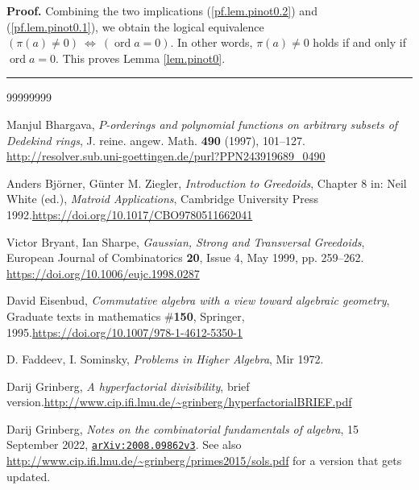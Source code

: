 \documentclass[numbers=enddot,12pt,final,onecolumn,notitlepage]{scrartcl}%
\theoremstyle{definition}
\newenvironment{proof}[1][Proof]{\noindent\textbf{#1.} }{\ \rule{0.5em}{0.5em}}
\theoremstyle{plainsl}
\begin{document}
\begin{proof}
Combining the two implications (\ref{pf.lem.pinot0.2}) and
(\ref{pf.lem.pinot0.1}), we obtain the logical equivalence $\left(  \pi\left(
a\right)  \neq0\right)  \ \Longleftrightarrow\ \left(  \operatorname*{ord}%
a=0\right)  $. In other words, $\pi\left(  a\right)  \neq0$ holds if and only
if $\operatorname*{ord}a=0$. This proves Lemma \ref{lem.pinot0}.
\end{proof}

\begin{thebibliography}{99999999}                                                                                         %


Manjul Bhargava, \textit{$P$-orderings and
polynomial functions on arbitrary subsets of Dedekind rings}, J. reine. angew.
Math. \textbf{490} (1997), 101--127. \url{http://resolver.sub.uni-goettingen.de/purl?PPN243919689_0490}

Anders Bj\"{o}rner, G\"{u}nter M. Ziegler,
\textit{Introduction to Greedoids}, Chapter 8 in: Neil White (ed.),
\textit{Matroid Applications}, Cambridge University Press 1992.\newline\url{https://doi.org/10.1017/CBO9780511662041}

Victor Bryant, Ian Sharpe, \textit{Gaussian,
Strong and Transversal Greedoids}, European Journal of Combinatorics
\textbf{20}, Issue 4, May 1999, pp. 259--262. \url{https://doi.org/10.1006/eujc.1998.0287}

David Eisenbud, \textit{Commutative algebra with a
view toward algebraic geometry}, Graduate texts in mathematics \#\textbf{150},
Springer, 1995.\newline\url{https://doi.org/10.1007/978-1-4612-5350-1}

D. Faddeev, I. Sominsky, \textit{Problems in
Higher Algebra}, Mir 1972.

Darij Grinberg, \textit{A hyperfactorial
divisibility}, brief version.\newline\url{http://www.cip.ifi.lmu.de/~grinberg/hyperfactorialBRIEF.pdf}

Darij Grinberg, \textit{Notes on the combinatorial
fundamentals of algebra}, 15 September 2022,
\texttt{\href{https://arxiv.org/abs/2008.09862v3}{arXiv:2008.09862v3}}. See
also \url{http://www.cip.ifi.lmu.de/~grinberg/primes2015/sols.pdf} for a
version that gets updated.



\end{thebibliography}
\end{document}
